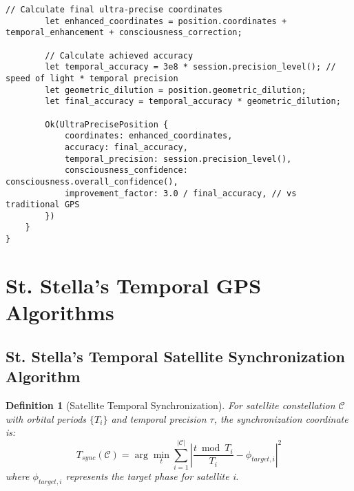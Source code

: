\documentclass[12pt,a4paper]{article}
\newtheorem{definition}{Definition}
\begin{document}
\begin{lstlisting}[style=ruststyle, caption=Rust Integration with Sighthound Autobahn Framework]
        // Calculate final ultra-precise coordinates
        let enhanced_coordinates = position.coordinates + temporal_enhancement + consciousness_correction;
        
        // Calculate achieved accuracy
        let temporal_accuracy = 3e8 * session.precision_level(); // speed of light * temporal precision
        let geometric_dilution = position.geometric_dilution;
        let final_accuracy = temporal_accuracy * geometric_dilution;
        
        Ok(UltraPrecisePosition {
            coordinates: enhanced_coordinates,
            accuracy: final_accuracy,
            temporal_precision: session.precision_level(),
            consciousness_confidence: consciousness.overall_confidence(),
            improvement_factor: 3.0 / final_accuracy, // vs traditional GPS
        })
    }
}
\end{lstlisting}

\section{St. Stella's Temporal GPS Algorithms}

\subsection{St. Stella's Temporal Satellite Synchronization Algorithm}

\begin{definition}[Satellite Temporal Synchronization]
For satellite constellation $\mathcal{C}$ with orbital periods $\{T_i\}$ and temporal precision $\tau$, the synchronization coordinate is:
\begin{equation}
T_{sync}(\mathcal{C}) = \arg\min_{t} \sum_{i=1}^{|\mathcal{C}|} \left| \frac{t \bmod T_i}{T_i} - \phi_{target,i} \right|^2
\end{equation}
where $\phi_{target,i}$ represents the target phase for satellite i.
\end{definition}
\end{document}
